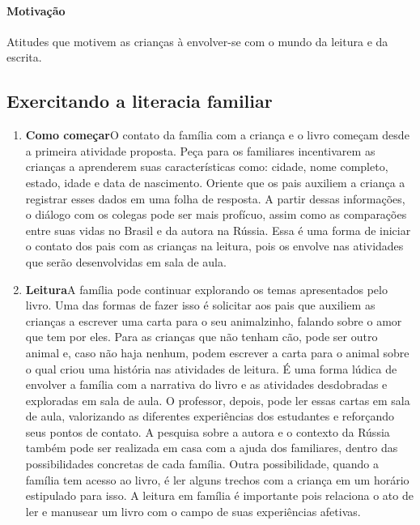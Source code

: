 \documentclass[11pt]{extarticle}
\begin{document}
\paragraph{Motivação} Atitudes que motivem as crianças à envolver-se com 
o mundo da leitura e da escrita.

\subsection{Exercitando a literacia familiar}


\begin{enumerate}
\item \textbf{Como começar}\quad O contato da família com a criança e o livro começam desde a primeira atividade proposta. Peça para os familiares incentivarem as crianças a aprenderem suas características como: cidade, nome completo, estado, idade e data de nascimento. Oriente que os pais auxiliem a criança a registrar esses dados em uma folha de resposta. A partir dessas informações, o diálogo com os colegas pode ser mais profícuo, assim como as comparações entre suas vidas no Brasil e da autora na Rússia. Essa é uma forma de iniciar o contato dos pais com as crianças na leitura, pois os envolve nas atividades que serão desenvolvidas em sala de aula.

\item \textbf{Leitura}\quad A família pode continuar 
explorando os temas apresentados pelo livro. Uma das formas de fazer isso é solicitar aos pais que auxiliem as crianças a escrever uma carta para o seu animalzinho, falando sobre o amor que tem por eles. Para as crianças que não tenham cão, pode ser outro animal e, caso não haja nenhum, podem escrever a carta para o animal sobre o qual criou uma história nas atividades de leitura. É uma forma lúdica de envolver a família com a narrativa do livro e as atividades desdobradas e exploradas em sala de aula. O professor, depois, pode ler essas cartas em sala de aula, valorizando as diferentes experiências dos estudantes e reforçando seus pontos de contato. A pesquisa sobre a autora e o contexto da Rússia também pode ser realizada em casa com a ajuda dos familiares, dentro das possibilidades concretas de cada família. Outra possibilidade, quando a família tem acesso ao livro, é ler alguns trechos com a criança em um horário estipulado para isso. A leitura em família é importante pois relaciona o ato de ler e manusear um livro com o campo de suas experiências afetivas.


\end{enumerate}
\end{document}
